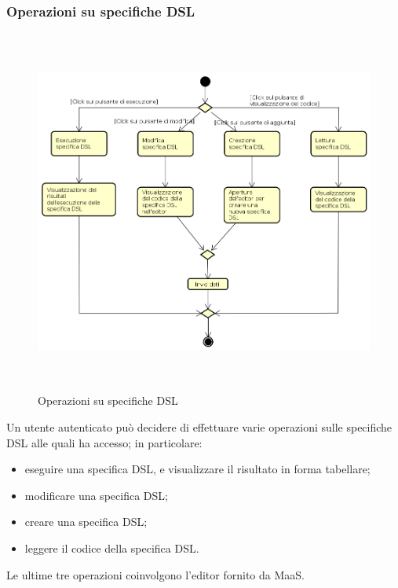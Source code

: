 \subsubsection{Operazioni su specifiche DSL}
\begin{figure}[H]
\begin{center}
\includegraphics[height=12cm]{res/sections/backend/activities/operazioniDSL.png}
\caption{Operazioni su specifiche DSL}
\end{center}
\end{figure}
Un utente autenticato può decidere di effettuare varie operazioni sulle specifiche DSL alle quali ha accesso; in particolare:
\begin{itemize}
\item eseguire una specifica DSL, e visualizzare il risultato in forma tabellare;
\item modificare una specifica DSL;
\item creare una specifica DSL;
\item leggere il codice della specifica DSL.
\end{itemize}
Le ultime tre operazioni coinvolgono l'editor fornito da MaaS.
